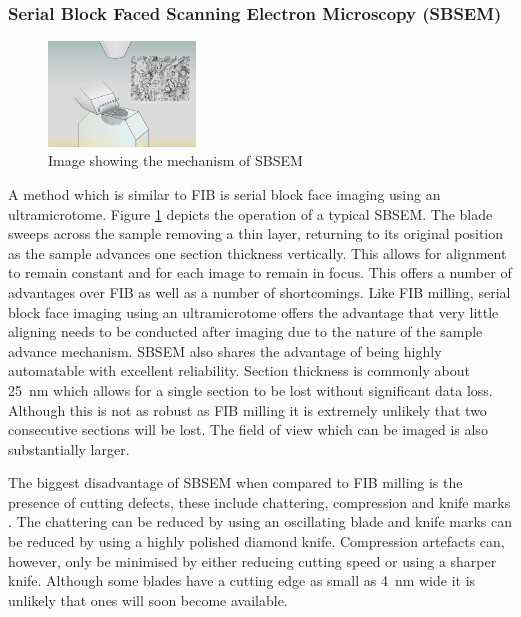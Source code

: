 \documentclass[a4paper, 11pt]{article}
\numberwithin{equation}{section}
\begin{document}
	\subsubsection{Serial Block Faced Scanning Electron Microscopy (SBSEM)}
	\label{sectioning_smallest_SBSEM}
	\begin{figure}[!h]
		\centering
		\includegraphics[width = 0.35\textwidth]{SBSEM}
		\caption[stuff]{Image showing the mechanism of SBSEM\footnotemark}
		\label{SBSEM_illustration}
	\end{figure}
	A method which is similar to FIB is serial block face imaging using an ultramicrotome. Figure \ref{SBSEM_illustration} depicts the operation of a typical SBSEM. The blade sweeps across the sample removing a thin layer, returning to its original position as the sample advances one section thickness vertically. This allows for alignment to remain constant and for each image to remain in focus. This offers a number of advantages over FIB as well as a number of shortcomings. Like FIB milling, serial block face imaging using an ultramicrotome offers the advantage that very little aligning needs to be conducted after imaging due to the nature of the sample advance mechanism. SBSEM also shares the advantage of being highly automatable with excellent reliability. Section thickness is commonly about \SI{25}{\nano\metre} which allows for a single section to be lost without significant data loss. Although this is not as robust as FIB milling it is extremely unlikely that two consecutive sections will be lost. The field of view which can be imaged is also substantially larger\cite{denk2004serial}.
	
	The biggest disadvantage of SBSEM when compared to FIB milling is the presence of cutting defects, these include chattering, compression and knife marks \cite{hashimoto20163d}. The chattering can be reduced by using an oscillating blade \cite{studer2000minimal} and knife marks can be reduced by using a highly polished diamond knife. Compression artefacts can, however, only be minimised by either reducing cutting speed or using a sharper knife. Although some blades have a cutting edge as small as \SI{4}{\nano\metre} wide it is unlikely that ones will soon become available.
	
\end{document}

